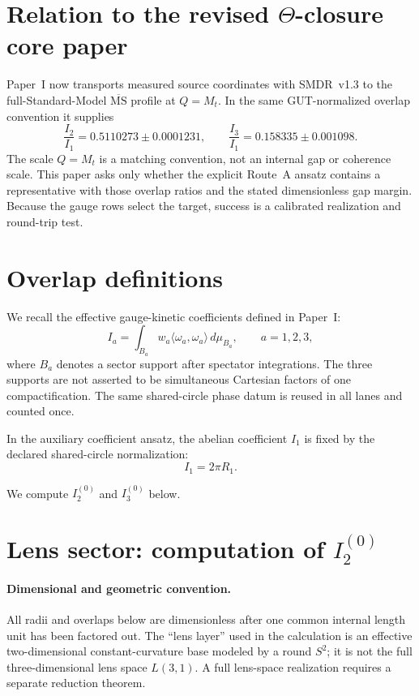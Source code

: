 \documentclass[11pt]{article}
\begin{document}
\section{Relation to the revised \texorpdfstring{$\Theta$}{Theta}-closure core paper}

Paper~I now transports measured source coordinates with SMDR~v1.3 to the
full-Standard-Model $\overline{\mathrm{MS}}$ profile at $Q=M_t$.  In the same
GUT-normalized overlap convention it supplies
\[
 \frac{I_2}{I_1}=0.5110273\pm0.0001231,
 \qquad
 \frac{I_3}{I_1}=0.158335\pm0.001098.
\]
The scale $Q=M_t$ is a matching convention, not an internal gap or coherence
scale.  This paper asks only whether the explicit Route~A ansatz contains a
representative with those overlap ratios and the stated dimensionless gap
margin.  Because the gauge rows select the target, success is a calibrated
realization and round-trip test.

\section{Overlap definitions}

We recall the effective gauge-kinetic coefficients defined in Paper~I:
\[
I_a = \int_{B_a}
w_a\langle \omega_a, \omega_a\rangle\,d\mu_{B_a},
\qquad a=1,2,3,
\]
where $B_a$ denotes a sector support after spectator integrations. The three
supports are not asserted to be simultaneous Cartesian factors of one
compactification. The same shared-circle phase datum is reused in all lanes
and counted once.

In the auxiliary coefficient ansatz, the abelian coefficient $I_1$ is fixed by
the declared shared-circle normalization:
\[
I_1 = 2\pi R_1.
\]

We compute $I_2^{(0)}$ and $I_3^{(0)}$ below.


\section{Lens sector: computation of
\texorpdfstring{$I_2^{(0)}$}{I2(0)}}

\paragraph{Dimensional and geometric convention.}
All radii and overlaps below are dimensionless after one common internal length
unit has been factored out.  The ``lens layer'' used in the calculation is an
effective two-dimensional constant-curvature base modeled by a round $S^2$; it
is not the full three-dimensional lens space $L(3,1)$.  A full lens-space
realization requires a separate reduction theorem.
\end{document}
